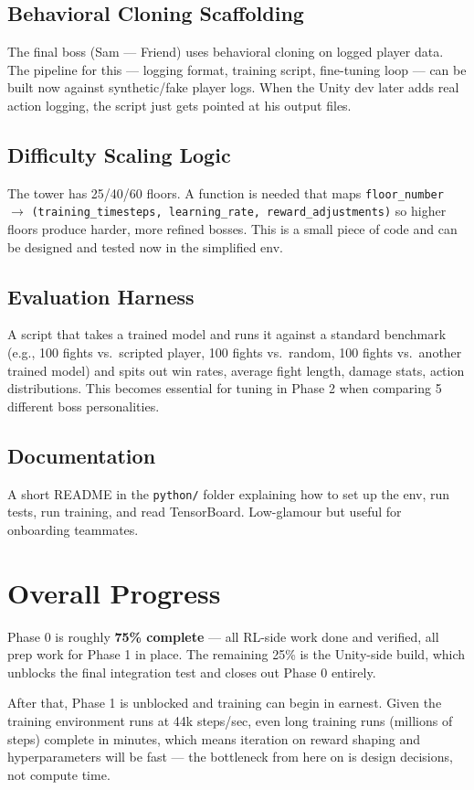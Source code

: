 \documentclass[11pt]{article}
\begin{document}
\subsection*{Behavioral Cloning Scaffolding}
The final boss (Sam --- Friend) uses behavioral cloning on logged player data. The pipeline for this --- logging format, training script, fine-tuning loop --- can be built now against synthetic/fake player logs. When the Unity dev later adds real action logging, the script just gets pointed at his output files.

\subsection*{Difficulty Scaling Logic}
The tower has 25/40/60 floors. A function is needed that maps \texttt{floor\_number} $\rightarrow$ \texttt{(training\_timesteps, learning\_rate, reward\_adjustments)} so higher floors produce harder, more refined bosses. This is a small piece of code and can be designed and tested now in the simplified env.

\subsection*{Evaluation Harness}
A script that takes a trained model and runs it against a standard benchmark (e.g., 100 fights vs.\ scripted player, 100 fights vs.\ random, 100 fights vs.\ another trained model) and spits out win rates, average fight length, damage stats, action distributions. This becomes essential for tuning in Phase 2 when comparing 5 different boss personalities.

\subsection*{Documentation}
A short README in the \texttt{python/} folder explaining how to set up the env, run tests, run training, and read TensorBoard. Low-glamour but useful for onboarding teammates.

\section*{Overall Progress}

Phase 0 is roughly \textbf{75\% complete} --- all RL-side work done and verified, all prep work for Phase 1 in place. The remaining 25\% is the Unity-side build, which unblocks the final integration test and closes out Phase 0 entirely.

After that, Phase 1 is unblocked and training can begin in earnest. Given the training environment runs at 44k steps/sec, even long training runs (millions of steps) complete in minutes, which means iteration on reward shaping and hyperparameters will be fast --- the bottleneck from here on is design decisions, not compute time.
\end{document}
